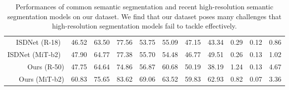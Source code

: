 \begin{table*}[t!]
{\begin{tabular}{r|c|ccc|ccc|ccc}
    ISDNet (R-18)~\cite{isdnet} & 46.52 & 63.50 & 77.56 & 53.75 & 55.09 & 47.15 & 43.34 & 0.29 & 0.12 & 0.86\\
    ISDNet (MiT-b2)~\cite{isdnet} & 47.90 & 64.77 & 77.38 & 55.70 & 54.48 & 46.77 & 49.51 & 0.26 & 0.13 & 1.02 \\ \hline
    Ours (R-50) & 47.75 & 64.64 & 74.86 & 56.87 & 60.68 & 50.19 & 38.19 & 1.24 & 0.13 & 4.67 \\ 
    Ours (MiT-b2) & 60.83 & 75.65 & 83.62 & 69.06 & 63.52 & 59.83 & 62.93 & 0.82 & 0.07 & 3.36 \\ \hline
\end{tabular}
\addtolength{\tabcolsep}{2pt}
}
\vspace{-1mm}
\caption{Performances of common semantic segmentation and recent high-resolution semantic segmentation models on our dataset. We find that our dataset poses many challenges that high-resolution segmentation models fail to tackle effectively.
}
\label{table:results}
\end{table*}

